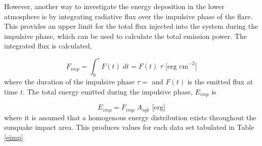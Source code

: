 \noindent
However, another way to investigate the energy deposition in the lower atmosphere is by integrating radiative flux over the impulsive phase of the flare. This provides an upper limit for the total flux injected into the system during the impulsive phase, which can be used to calculate the total emission power. The integrated flux is calculated,

\begin{equation}
F_{imp} = \int_{0}^{\tau} F(t) \; dt = F(t) \; \tau \text{ [erg cm}^{-2}]
\end{equation}\label{f-imp}
\noindent
where the duration of the impulsive phase $\tau = $ and $F(t)$ is the emitted flux at time $t$. The total energy emitted during the impulsive phase, $E_{imp}$ is

\begin{equation}
E_{imp}=F_{imp} \; A_{sqk} \text{ [erg}]
\end{equation}\label{e-imp}
\noindent
where it is assumed that a homogenous energy distribution exists throughout the sunquake impact area. This produces values for each data set tabulated in Table \ref{eimp}. 


